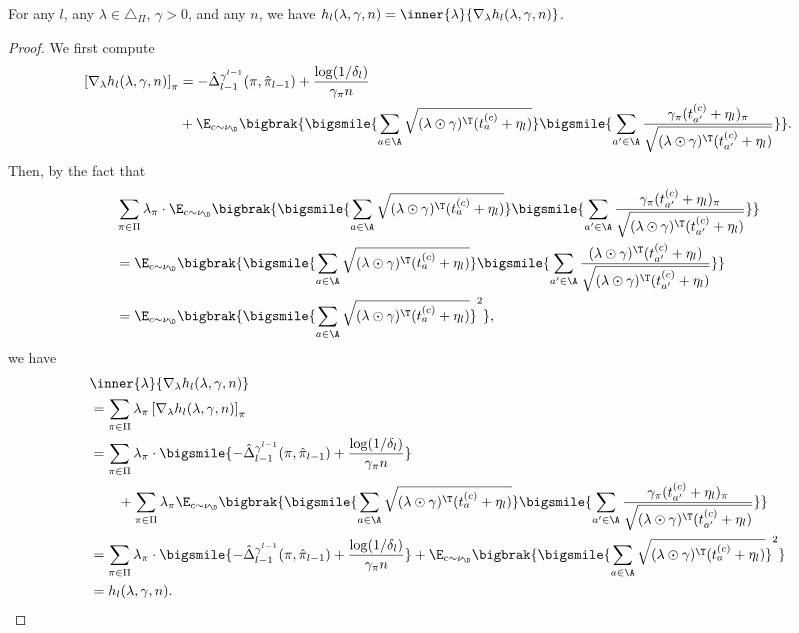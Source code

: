 \documentclass{article}
\newcommand{\1}{\mathbf{1}}
\begin{document}
\begin{lemma}\label{lem:gg}
For any $l$, any $\lambda\in\triangle_\Pi$, $\gamma>0$, and any $n$, we have $h_l(\lambda,\gamma,n)=\inner{\lambda}{\nabla_\lambda h_l(\lambda,\gamma,n)}$.
\end{lemma}
\begin{proof}
We first compute 
\begin{align*}
    \left[\nabla_\lambda h_l(\lambda,\gamma,n)\right]_\pi&=-\hat{\Delta}_{l-1}^{\gamma^{l-1}}(\pi,\hat{\pi}_{l-1})+\frac{\log(1/\delta_l)}{\gamma_\pi n}\\
    &+\E_{c\sim\nu_\D}\bigbrak{\bigsmile{\sum_{a\in\A}\sqrt{(\lambda\odot \gamma)^\T (t_a^{(c)}+\eta_l)}}\bigsmile{\sum_{a'\in\A}\frac{\gamma_\pi(t_{a'}^{(c)}+\eta_l)_\pi}{\sqrt{(\lambda\odot \gamma)^\T (t_{a'}^{(c)}+\eta_l)}}}}.
\end{align*}
Then, by the fact that 
\begin{align*}
    &\sum_{\pi\in\Pi}\lambda_\pi\cdot\E_{c\sim\nu_\D}\bigbrak{\bigsmile{\sum_{a\in\A}\sqrt{(\lambda\odot \gamma)^\T (t_a^{(c)}+\eta_l)}}\bigsmile{\sum_{a'\in\A}\frac{\gamma_\pi(t_{a'}^{(c)}+\eta_l)_\pi}{\sqrt{(\lambda\odot \gamma)^\T (t_{a'}^{(c)}+\eta_l)}}}}\\
    &= \E_{c\sim\nu_\D}\bigbrak{\bigsmile{\sum_{a\in\A}\sqrt{(\lambda\odot \gamma)^\T (t_a^{(c)}+\eta_l)}}\bigsmile{\sum_{a'\in\A}\frac{(\lambda\odot\gamma)^\T(t_{a'}^{(c)}+\eta_l)}{\sqrt{(\lambda\odot \gamma)^\T (t_{a'}^{(c)}+\eta_l)}}}}\\
    &= \E_{c\sim\nu_\D}\bigbrak{\bigsmile{\sum_{a\in\A}\sqrt{(\lambda\odot \gamma)^\T (t_a^{(c)}+\eta_l)}}^2},
\end{align*}
we have
\begin{align*}
    &\inner{\lambda}{\nabla_\lambda h_l(\lambda,\gamma,n)}\\
    &= \sum_{\pi\in\Pi}\lambda_\pi\left[\nabla_\lambda h_l(\lambda,\gamma,n)\right]_\pi\\
    &= \sum_{\pi\in\Pi}\lambda_\pi\cdot\bigsmile{-\hat{\Delta}_{l-1}^{\gamma^{l-1}}(\pi,\hat{\pi}_{l-1})+\frac{\log(1/\delta_l)}{\gamma_\pi n}}\\
    &\qquad+\sum_{\pi\in\Pi}\lambda_\pi\E_{c\sim\nu_\D}\bigbrak{\bigsmile{\sum_{a\in\A}\sqrt{(\lambda\odot \gamma)^\T (t_a^{(c)}+\eta_l)}}\bigsmile{\sum_{a'\in\A}\frac{\gamma_\pi(t_{a'}^{(c)}+\eta_l)_\pi}{\sqrt{(\lambda\odot \gamma)^\T (t_{a'}^{(c)}+\eta_l)}}}}\\
    &= \sum_{\pi\in\Pi}\lambda_\pi\cdot\bigsmile{-\hat{\Delta}_{l-1}^{\gamma^{l-1}}(\pi,\hat{\pi}_{l-1})+\frac{\log(1/\delta_l)}{\gamma_\pi n}}+\E_{c\sim\nu_\D}\bigbrak{\bigsmile{\sum_{a\in\A}\sqrt{(\lambda\odot \gamma)^\T (t_a^{(c)}+\eta_l)}}^2}\\
    &= h_l(\lambda,\gamma,n).
\end{align*}
\end{proof}
\end{document}
